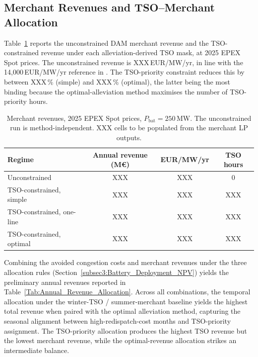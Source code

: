 \subsection{Merchant Revenues and TSO--Merchant Allocation}\label{Subsec4:Merchant_Revenues}
 
Table~\ref{Tab:Merchant_Revenues} reports the unconstrained DAM merchant revenue and the TSO-constrained revenue under each alleviation-derived TSO mask, at 2025 EPEX Spot prices. The unconstrained revenue is XXX\,EUR/MW/yr, in line with the 14{,}000\,EUR/MW/yr reference in \citet{Fluence_Consentec_2022_GridBooster_Profitability_Assessment}. The TSO-priority constraint reduces this by between XXX\,\% (simple) and XXX\,\% (optimal), the latter being the most binding because the optimal-alleviation method maximises the number of TSO-priority hours.
 
\begin{table}[htbp]
\centering
\caption{Merchant revenues, 2025 EPEX Spot prices, $P_{\mathrm{bat}} = 250$\,MW. The unconstrained run is method-independent. XXX cells to be populated from the merchant LP outputs.}
\label{Tab:Merchant_Revenues}
\small
\begin{tabular}{lccc}
\toprule
Regime & Annual revenue (M\euro) & EUR/MW/yr & TSO hours \\
\midrule
Unconstrained                 & XXX & XXX & 0 \\
TSO-constrained, simple       & XXX & XXX & XXX \\
TSO-constrained, one-line     & XXX & XXX & XXX \\
TSO-constrained, optimal      & XXX & XXX & XXX \\
\bottomrule
\end{tabular}
\end{table}
 
 
Combining the avoided congestion costs and merchant revenues under the three allocation rules (Section~\ref{subsec3:Battery_Deployment_NPV}) yields the preliminary annual revenues reported in Table~\ref{Tab:Annual_Revenue_Allocation}. Across all combinations, the temporal allocation under the winter-TSO / summer-merchant baseline yields the highest total revenue when paired with the optimal alleviation method, capturing the seasonal alignment between high-redispatch-cost months and TSO-priority assignment. The TSO-priority allocation produces the highest TSO revenue but the lowest merchant revenue, while the optimal-revenue allocation strikes an intermediate balance.
 
